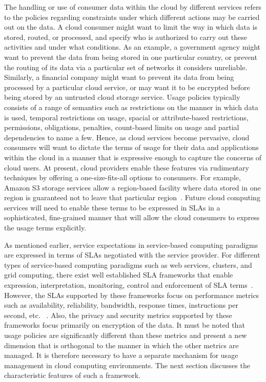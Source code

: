 \documentclass[times, 10pt,twocolumn]{article}
\begin{document}
The handling or use of consumer data within the cloud by different services refers to the policies regarding constraints under which different actions may be carried out on the data. A cloud consumer might want to limit the way in which data is stored, routed, or processed, and specify who is authorized to carry out these activities and under what conditions. As an example, a government agency might want to prevent the data from being stored in one particular country, or prevent the routing of its data via a particular set of networks it considers unreliable. Similarly, a financial company might want to prevent its data from being processed by a particular cloud service, or may want it to be encrypted before being stored by an untrusted cloud storage service. Usage policies typically consists of a range of semantics such as restrictions on the manner in which data is used, temporal restrictions on usage, spacial or attribute-based restrictions, permissions, obligations, penalties, count-based limits on usage and partial dependencies to name a few.   Hence, as cloud services become pervasive, cloud consumers will want to dictate the terms of usage for their data and applications within the cloud in a manner that is expressive enough to capture the concerns of cloud users. At present, cloud providers enable these features via rudimentary techniques by offering a one-size-fits-all options to consumers. For example, Amazon S3 storage services allow a region-based facility where data stored in one region is guaranteed not to leave that particular region~\cite{AWS}. Future cloud computing services will need to enable these terms to be expressed in SLAs in a sophisticated, fine-grained manner that will allow the cloud consumers to express the usage terms explicitly. 

As mentioned earlier, service expectations in service-based computing paradigms are expressed in terms of SLAs negotiated with the service provider. For different types of service-based computing paradigms such as web services, clusters, and grid computing, there exist well established SLA frameworks that enable expression, interpretation, monitoring, control and enforcement of SLA terms~\cite{WSA, WSLA, WSP,PaRaSh:09}. However, the SLAs supported by these frameworks focus on performance metrics such as availability, reliability, bandwidth, response times, instructions per second, etc. ~\cite{PaSc:06}. Also, the privacy and security metrics supported by these frameworks focus primarily on encryption of the data. It must be noted that usage policies are significantly different than these metrics and present a new dimension that is orthogonal to the manner in which the other metrics are managed. It is therefore necessary to have a separate mechanism for usage management in cloud computing environments. The next section discusses the characteristic features of such a framework.
\end{document}
